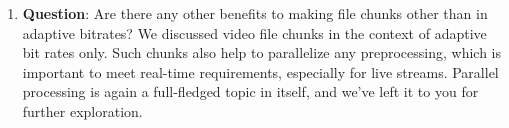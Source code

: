 \begin{enumerate}
\item
\protect{}\label{eP-9jmhkXQgwU4r5dPuLG}
\textbf{Question}: Are there any other benefits to making file chunks other than in adaptive bitrates? We discussed video file chunks in the context of adaptive bit rates only. Such chunks also help to parallelize any preprocessing, which is important to meet real-time requirements, especially for live streams. Parallel processing is again a full-fledged topic in itself, and we've left it to you for further exploration.
\end{enumerate}

